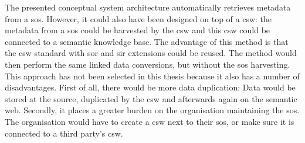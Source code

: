 The presented conceptual system architecture automatically retrieves metadata from a \ac{sos}. However, it could also have been designed on top of a \ac{csw}: the metadata from a \ac{sos} could be harvested by the \ac{csw} and this \ac{csw} could be connected to a semantic knowledge base. The advantage of this method is that the \ac{csw} standard with \acs{sor} and \acs{sir} extensions could be reused. The method would then perform the same linked data conversions, but without the \ac{sos} harvesting. This approach has not been selected in this thesis because it also has a number of disadvantages. First of all, there would be more data duplication: Data would be stored at the source, duplicated by the \ac{csw} and afterwards again on the semantic web. Secondly, it places a greater burden on the organisation maintaining the \ac{sos}. The organisation would have to create a \ac{csw} next to their \ac{sos}, or make sure it is connected to a third party's \ac{csw}.  





